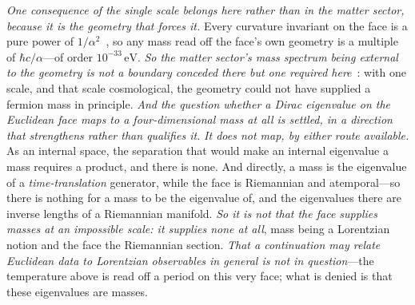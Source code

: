 \documentclass[11pt]{article}
\theoremstyle{plain}
\theoremstyle{remark}
\begin{document}
\emph{One consequence of the single scale belongs here rather than in the matter sector, because it is the geometry that forces it.} Every curvature invariant on the face is a pure power of $1/\alpha^{2}$~\cite{JanzenGeometricCore}, so any mass read off the face's own geometry is a multiple of $\hbar c/\alpha$---of order $10^{-33}\,\mathrm{eV}$. \emph{So the matter sector's mass spectrum being external to the geometry is not a boundary conceded there but one required here}~\cite{JanzenMatter}: with one scale, and that scale cosmological, the geometry could not have supplied a fermion mass in principle. \emph{And the question whether a Dirac eigenvalue on the Euclidean face maps to a four-dimensional mass at all is settled, in a direction that strengthens rather than qualifies it.} \emph{It does not map, by either route available.} As an internal space, the separation that would make an internal eigenvalue a mass requires a product, and there is none. And directly, a mass is the eigenvalue of a \emph{time-translation} generator, while the face is Riemannian and atemporal---so there is nothing for a mass to be the eigenvalue of, and the eigenvalues there are inverse lengths of a Riemannian manifold. \emph{So it is not that the face supplies masses at an impossible scale: it supplies none at all}, mass being a Lorentzian notion and the face the Riemannian section. \emph{That a continuation may relate Euclidean data to Lorentzian observables in general is not in question}---the temperature above is read off a period on this very face; what is denied is that these eigenvalues are masses.
\end{document}

